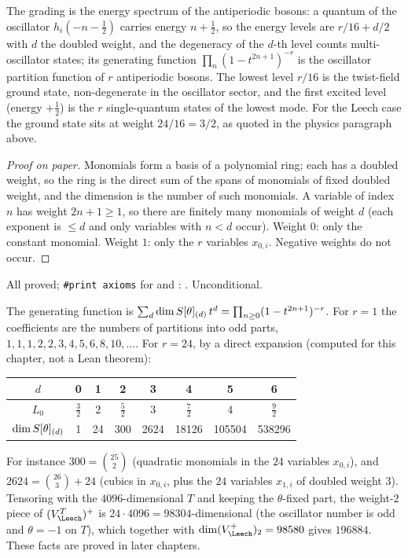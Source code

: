 \begin{physics}
The grading is the energy spectrum of the antiperiodic bosons: a quantum of the oscillator $h_i(-n-\tfrac12)$ carries energy $n+\tfrac12$, so the energy levels are $r/16+d/2$ with $d$ the doubled weight, and the degeneracy of the $d$-th level counts multi-oscillator states; its generating function $\prod_n(1-t^{2n+1})^{-r}$ is the oscillator partition function of $r$ antiperiodic bosons. The lowest level $r/16$ is the twist-field ground state, non-degenerate in the oscillator sector, and the first excited level (energy $+\tfrac12$) is the $r$ single-quantum states of the lowest mode. For the Leech case the ground state sits at weight $24/16=3/2$, as quoted in the physics paragraph above.
\end{physics}
\begin{proof}[Proof on paper]
Monomials form a basis of a polynomial ring; each has a doubled weight, so the ring is the direct
sum of the spans of monomials of fixed doubled weight, and the dimension is the number of such
monomials.  A variable of index $n$ has weight $2n+1\ge1$, so there are finitely many monomials of
weight $d$ (each exponent is $\le d$ and only variables with $n<d$ occur).  Weight $0$: only the
constant monomial.  Weight $1$: only the $r$ variables $x_{0,i}$.  Negative weights do not occur.
\end{proof}
\begin{status}
All proved; \texttt{\#print axioms} for  and :
.  Unconditional.
\end{status}

\begin{example}\label{ch06:ex:dims}
The generating function is $\sum_d\dim S[\theta]_{(d)}\,t^d=\prod_{n\ge0}(1-t^{2n+1})^{-r}$.  For
$r=1$ the coefficients are the numbers of partitions into odd parts,
$1,1,1,2,2,3,4,5,6,8,10,\dots$.  For $r=24$, by a direct expansion (computed for this chapter, not a
Lean theorem):
\begin{center}
\begin{tabular}{c|ccccccc}
$d$ & 0&1&2&3&4&5&6\\\hline
$L_0$ & $\frac32$&$2$&$\frac52$&$3$&$\frac72$&$4$&$\frac92$\\
$\dim S[\theta]_{(d)}$ & 1&24&300&2624&18126&105504&538296
\end{tabular}
\end{center}
For instance $300=\binom{25}{2}$ (quadratic monomials in the $24$ variables $x_{0,i}$), and
$2624=\binom{26}3+24$ (cubics in $x_{0,i}$, plus the $24$ variables $x_{1,i}$ of doubled weight
$3$).  Tensoring with the $4096$-dimensional $T$ and keeping the $\theta$-fixed part, the weight-$2$
piece of $(V_\Leech^T)^+$ is $24\cdot 4096=98304$-dimensional (the oscillator number is odd and
$\theta=-1$ on $T$), which together with $\dim(V_\Leech^+)_2=98580$ gives $196884$.  These facts
are proved in later chapters.
\end{example}

